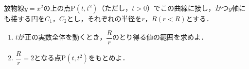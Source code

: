 \documentclass[../../main.tex]{subfiles}
\begin{document}
放物線$y=x^2$の上の点$\mathrm{P}(t,t^2)$（ただし，$t>0$）でこの曲線に接し，かつ$y$軸にも接する円を$C_1$，$C_2$とし，それぞれの半径を$r$，$R(r<R)$とする．
\begin{enumerate}
  \item $t$が正の実数全体を動くとき，$\dfrac{R}{r}$のとり得る値の範囲を求めよ．
  \item $\dfrac{R}{r}=2$となる点$\mathrm{P}(t,t^2)$をもとめよ．
\end{enumerate}
\end{document}
